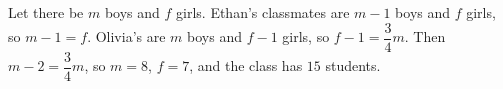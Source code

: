 Let there be $m$ boys and $f$ girls. Ethan's classmates are $m-1$ boys and $f$ girls, so $m-1=f$. Olivia's are $m$ boys and $f-1$ girls, so $f-1=\dfrac34m$. Then $m-2=\dfrac34m$, so $m=8$, $f=7$, and the class has $\boxed{15}$ students.
